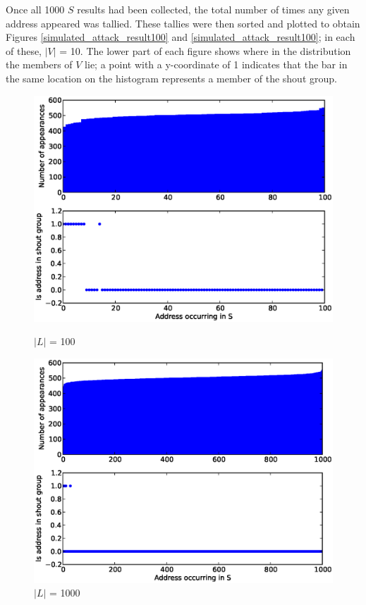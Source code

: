 \documentclass[ %
                    author={Luke Murray},
                supervisor={Dr. Simon Hollis},
                     title={Shadow Peer-to-Peer Networks},
                  subtitle={},
                    degree={MEng},
                      year={2013} ]{thesis}
\begin{document}
Once all 1000 $S$ results had been collected, the total number of times any given address appeared was tallied. These tallies were then sorted and plotted to obtain Figures \ref{simulated_attack_result100} and \ref{simulated_attack_result100}; in each of these, $|V|$ = 10. The lower part of each figure shows where in the distribution the members of $V$ lie; a point with a y-coordinate of 1 indicates that the bar in the same location on the histogram represents a member of the shout group.

\begin{figure}[h]%
    \centering
    \begin{minipage}[b]{0.4\linewidth}
        \centering
        \includegraphics[width=\linewidth]{diagrams/split_attack_100.eps}
        \caption{$|L|$ = 100}
        \label{simulated_attack_result100}
    \end{minipage}
    \hspace{0.5cm}
    \begin{minipage}[b]{0.4\linewidth}
        \centering
        \includegraphics[width=\linewidth]{diagrams/split_attack_1000.eps}
        \caption{$|L|$ = 1000}
        \label{simulated_attack_result1000}
    \end{minipage}
\end{figure}
\end{document}
